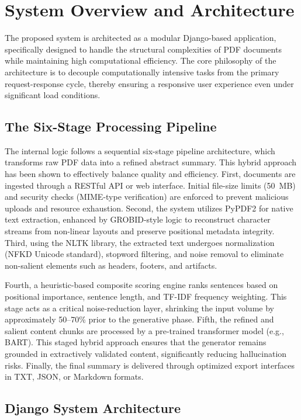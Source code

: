 \documentclass[conference]{IEEEtran}
\begin{document}
\section{System Overview and Architecture}

The proposed system is architected as a modular Django-based application, specifically designed to handle the structural complexities of PDF documents while maintaining high computational efficiency. The core philosophy of the architecture is to decouple computationally intensive tasks from the primary request-response cycle, thereby ensuring a responsive user experience even under significant load conditions.

\subsection{The Six-Stage Processing Pipeline}

The internal logic follows a sequential six-stage pipeline architecture, which transforms raw PDF data into a refined abstract summary. This hybrid approach has been shown to effectively balance quality and efficiency. First, documents are ingested through a RESTful API or web interface. Initial file-size limits (50~MB) and security checks (MIME-type verification) are enforced to prevent malicious uploads and resource exhaustion. Second, the system utilizes PyPDF2 for native text extraction, enhanced by GROBID-style logic to reconstruct character streams from non-linear layouts and preserve positional metadata integrity. Third, using the NLTK library, the extracted text undergoes normalization (NFKD Unicode standard), stopword filtering, and noise removal to eliminate non-salient elements such as headers, footers, and artifacts.

Fourth, a heuristic-based composite scoring engine ranks sentences based on positional importance, sentence length, and TF-IDF frequency weighting. This stage acts as a critical noise-reduction layer, shrinking the input volume by approximately 50--70\% prior to the generative phase. Fifth, the refined and salient content chunks are processed by a pre-trained transformer model (e.g., BART). This staged hybrid approach ensures that the generator remains grounded in extractively validated content, significantly reducing hallucination risks. Finally, the final summary is delivered through optimized export interfaces in TXT, JSON, or Markdown formats.

\subsection{Django System Architecture}
\end{document}
